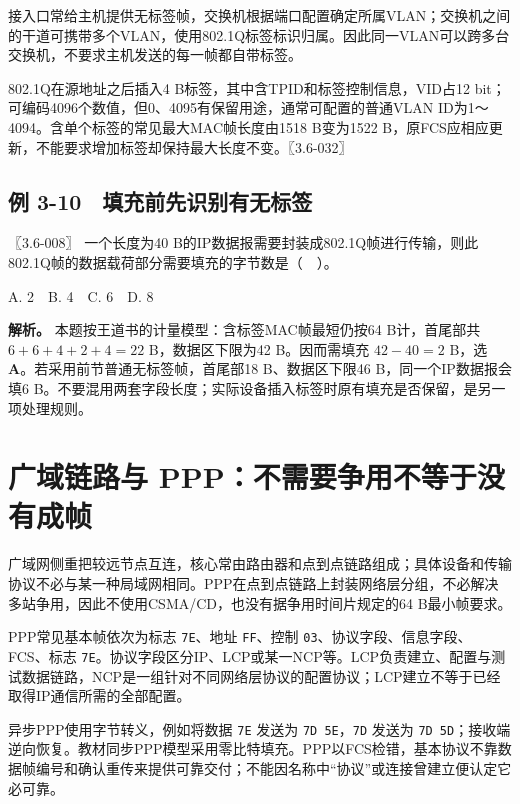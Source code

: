 接入口常给主机提供无标签帧，交换机根据端口配置确定所属VLAN；交换机之间的干道可携带多个VLAN，使用802.1Q标签标识归属。因此同一VLAN可以跨多台交换机，不要求主机发送的每一帧都自带标签。

802.1Q在源地址之后插入4 B标签，其中含TPID和标签控制信息，VID占12 bit；可编码4096个数值，但0、4095有保留用途，通常可配置的普通VLAN ID为1～4094。含单个标签的常见最大MAC帧长度由1518 B变为1522 B，原FCS应相应更新，不能要求增加标签却保持最大长度不变。〖3.6-032〗

\subsection{例 3-10　填充前先识别有无标签}\label{cn-ex3-10}

\noindent{}〖3.6-008〗 一个长度为40 B的IP数据报需要封装成802.1Q帧进行传输，则此802.1Q帧的数据载荷部分需要填充的字节数是（　）。

A. 2　B. 4　C. 6　D. 8


\textbf{解析。} 本题按王道书的计量模型：含标签MAC帧最短仍按64 B计，首尾部共 \(6+6+4+2+4=22\) B，数据区下限为42 B。因而需填充 \(42-40=2\) B，选 \textbf{A}。若采用前节普通无标签帧，首尾部18 B、数据区下限46 B，同一个IP数据报会填6 B。不要混用两套字段长度；实际设备插入标签时原有填充是否保留，是另一项处理规则。

\section{广域链路与 PPP：不需要争用不等于没有成帧}\label{cn-03-18}

广域网侧重把较远节点互连，核心常由路由器和点到点链路组成；具体设备和传输协议不必与某一种局域网相同。PPP在点到点链路上封装网络层分组，不必解决多站争用，因此不使用CSMA/CD，也没有据争用时间片规定的64 B最小帧要求。

PPP常见基本帧依次为标志 \allowbreak{}\texttt{7E}、地址 \allowbreak{}\texttt{FF}、控制 \allowbreak{}\texttt{03}、协议字段、信息字段、FCS、标志 \allowbreak{}\texttt{7E}。协议字段区分IP、LCP或某一NCP等。LCP负责建立、配置与测试数据链路，NCP是一组针对不同网络层协议的配置协议；LCP建立不等于已经取得IP通信所需的全部配置。

异步PPP使用字节转义，例如将数据 \allowbreak{}\texttt{7E} 发送为 \allowbreak{}\texttt{7D\ 5E}，\allowbreak{}\texttt{7D} 发送为 \allowbreak{}\texttt{7D\ 5D}；接收端逆向恢复。教材同步PPP模型采用零比特填充。PPP以FCS检错，基本协议不靠数据帧编号和确认重传来提供可靠交付；不能因名称中``协议''或连接曾建立便认定它必可靠。

